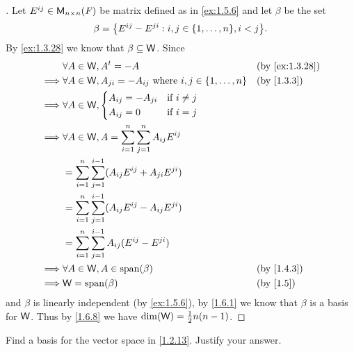 \begin{proof}[]
  Let \(E^{i j} \in \mathsf{M}_{{n} \times n}({\mathit{F}})\) be matrix defined as in \cref{ex:1.5.6} and let \(\beta\) be the set
  \[
    \beta = \set{E^{i j} - E^{j i} : i, j \in \set{1, \dots, n}, i < j}.
  \]
  By \cref{ex:1.3.28} we know that \(\beta \subseteq \mathsf{W}\).
  Since
  \begin{align*}
             & \forall A \in \W, \tp{A} = -A                                                  &  & \text{(by \cref{ex:1.3.28})} \\
    \implies & \forall A \in \W, A_{j i} = -A_{i j} \text{ where } i, j \in \set{1, \dots, n} &  & \text{(by \cref{1.3.3})}     \\
    \implies & \forall A \in \W, \begin{dcases}
      A_{i j} = -A_{j i} & \text{if } i \neq j \\
      A_{i j} = 0        & \text{if } i = j
    \end{dcases}                                                                     \\
    \implies & \forall A \in \W, A = \sum_{i = 1}^n \sum_{j = 1}^n A_{i j} E^{i j}                                              \\
             & = \sum_{i = 1}^n \sum_{j = 1}^{i - 1} (A_{i j} E^{i j} + A_{j i} E^{j i})                                        \\
             & = \sum_{i = 1}^n \sum_{j = 1}^{i - 1} (A_{i j} E^{i j} - A_{i j} E^{j i})                                        \\
             & = \sum_{i = 1}^n \sum_{j = 1}^{i - 1} A_{i j} (E^{i j} - E^{j i})                                                \\
    \implies & \forall A \in \W, A \in \spn{\beta}                                            &  & \text{(by \cref{1.4.3})}     \\
    \implies & \W = \spn{\beta}                                                               &  & \text{(by \cref{1.5})}
  \end{align*}
  and \(\beta\) is linearly independent (by \cref{ex:1.5.6}), by \cref{1.6.1} we know that \(\beta\) is a basis for \(\mathsf{W}\).
  Thus by \cref{1.6.8} we have \(\dim(\mathsf{W}) = \frac{1}{2} n(n - 1)\).
\end{proof}

\begin{ex}\label{ex:1.6.18}
  Find a basis for the vector space in \cref{1.2.13}.
  Justify your answer.
\end{ex}


